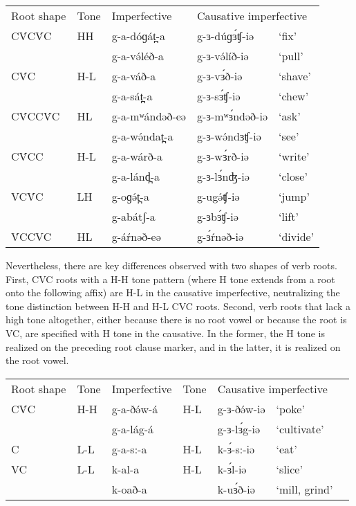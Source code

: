 \ea	
\begin{tabular}[t]{lllll}
Root shape&	Tone  & Imperfective	& \multicolumn{2}{l}{Causative imperfective}\\
CV́CV́C	&	HH	&	g-a-dóɡát̪-a	&	g-ɜ-dúɡɜ́ʧ-iə	&	‘fix’\\
 	 	&		&	g-a-və́léð-a	&	g-ɜ-və́líð-iə		&	‘pull’\\
CV́C		&	H-L	&	g-a-váð-a	&	g-ɜ-vɜ́ð-iə		&	‘shave’\\
	 	&		&	g-a-sát̪-a	&	g-ɜ-sɜ́ʧ-iə		&	‘chew’\\
CV́CCV́C	&	HL	&	g-a-mʷándəð-eə&	g-ɜ-mʷɜ́ndəð-iə	&	‘ask’\\
 		&		&	g-a-wə́ndat̪-a	&	g-ɜ-wə́ndɜʧ-iə	&	‘see’\\
CV́CC	&	H-L	&	g-a-wárð-a	&	g-ɜ-wɜ́rð-iə		&	‘write’\\
		&		&	g-a-lánd̪-a	&	g-ɜ-lɜ́nʤ-iə		&	‘close’\\
VCV́C	&	LH	&	g-oɡə́t̪-a		&	g-ugə́ʧ-iə		&	‘jump’\\
		&		&	g-abátʃ-a	&	g-ɜbɜ́ʧ-iə		&	‘lift’\\
V́CCVC	&	HL	&	g-áŕnəð-eə	&	g-ɜ́ŕnəð-iə		&	‘divide’\\	
\end{tabular}
\z

Nevertheless, there are key differences observed with two shapes of verb roots. First, CVC roots with a H-H tone pattern (where H tone extends from a root onto the following affix) are H-L in the causative imperfective, neutralizing the tone distinction between H-H and H-L CVC roots. Second, verb roots that lack a high tone altogether, either because there is no root vowel or because the root is VC, are specified with H tone in the causative. In the former, the H tone is realized on the preceding root clause marker, and in the latter, it is realized on the root vowel. 

\ea	       	
\begin{tabular}[t]{lllllll}
Root shape	&	Tone&	Imperfective	&	Tone	&	\multicolumn{2}{l}{Causative imperfective}	\\
CV́C			&	H-H	&	g-a-ðə́w-á		&	H-L	&	g-ɜ-ðə́w-iə	&	‘poke’\\
	& 	&	g-a-lág-á	&		&	g-ɜ-lɜ́g-iə	&	‘cultivate’\\
C			&	L-L	&	g-a-s:-a		&	H-L	&	k-ɜ́-s:-iə	&	‘eat’\\
VC			&	L-L	&	k-al-a		&	H-L	&	k-ɜ́l-iə		&	‘slice’\\
	&		&	k-oað-a		&		&	k-uɜ́ð-iə	&	‘mill, grind’\\	
\end{tabular}
\z

